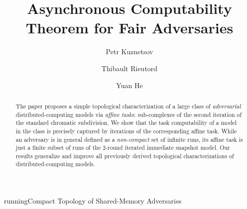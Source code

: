 \documentclass[a4paper]{article}
\begin{document}
\title{Asynchronous Computability Theorem for Fair Adversaries}
running{Compact Topology of Shared-Memory Adversaries}

\author[1]{Petr Kuznetsov}
\author[1]{Thibault Rieutord}
\author[3]{Yuan He}






\date{}
\maketitle
\begin{abstract}
The paper proposes a simple topological characterization of
a large class of \emph{adversarial} distributed-computing models via  
\emph{affine tasks}: sub-complexes of the second
iteration of the standard chromatic subdivision.
We show that the task computability of a model in the class is precisely captured by
iterations of the corresponding affine task. 
While an adversary is in general defined as a \emph{non-compact} set of 
infinite runs, its affine task  is just a finite subset of runs of the
$2$-round iterated immediate snapshot model.
%
Our results generalize and improve all previously derived
topological characterizations of distributed-computing models. 
%
%
\end{abstract}
\end{document}
